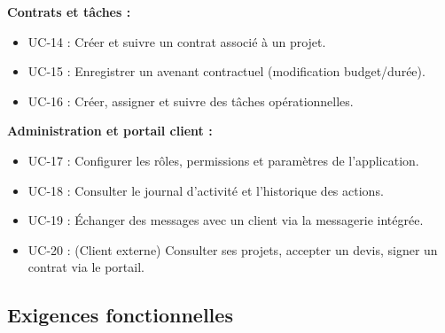 \textbf{Contrats et tâches :}
\begin{itemize}
  \item UC-14 : Créer et suivre un contrat associé à un projet.
  \item UC-15 : Enregistrer un avenant contractuel (modification budget/durée).
  \item UC-16 : Créer, assigner et suivre des tâches opérationnelles.
\end{itemize}

\textbf{Administration et portail client :}
\begin{itemize}
  \item UC-17 : Configurer les rôles, permissions et paramètres de l'application.
  \item UC-18 : Consulter le journal d'activité et l'historique des actions.
  \item UC-19 : Échanger des messages avec un client via la messagerie intégrée.
  \item UC-20 : (Client externe) Consulter ses projets, accepter un devis, signer
  un contrat via le portail.
\end{itemize}

\subsection{Exigences fonctionnelles}

